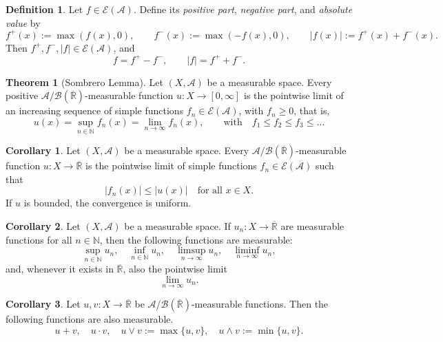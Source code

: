 \documentclass[12pt]{article}
\theoremstyle{definition}
\newtheorem{definition}{Definition}[section]
\newtheorem{theorem}{Theorem}[section]
\newtheorem{corollary}{Corollary}[theorem]
\begin{document}
\medskip
\begin{definition}
Let \( f \in \mathcal{E}(\mathcal{A}) \). Define its \emph{positive part}, \emph{negative part}, and \emph{absolute value} by
\[
f^+(x) := \max(f(x), 0), \qquad
f^-(x) := \max(-f(x), 0), \qquad
|f(x)| := f^+(x) + f^-(x).
\]
Then \( f^+, f^-, |f| \in \mathcal{E}(\mathcal{A}) \), and
\[
f = f^+ - f^-, \qquad |f| = f^+ + f^-.
\]
\end{definition}

\medskip
\begin{theorem}[Sombrero Lemma]
Let \( (X, \mathcal{A}) \) be a measurable space. Every positive \( \mathcal{A}/\mathcal{B}(\overline{\mathbb{R}})\)-measurable function \( u : X \to [0, \infty] \) is the pointwise limit of an increasing sequence of simple functions \( f_n \in \mathcal{E}(\mathcal{A}) \), with \( f_n \geq 0 \), that is,
\[
u(x) = \sup_{n \in \mathbb{N}} f_n(x) = \lim_{n \to \infty} f_n(x), \qquad \text{with} \quad f_1 \leq f_2 \leq f_3 \leq \dots
\]
\end{theorem}

\medskip
\begin{corollary}
Let \( (X, \mathcal{A}) \) be a measurable space.  
Every \( \mathcal{A}/\mathcal{B}(\overline{\mathbb{R}})\)-measurable function \( u : X \to \overline{\mathbb{R}} \) is the pointwise limit of simple functions \( f_n \in \mathcal{E}(\mathcal{A}) \) such that
\[
|f_n(x)| \leq |u(x)| \quad \text{for all } x \in X.
\]
If \( u \) is bounded, the convergence is uniform.
\end{corollary}

\medskip
\begin{corollary}
Let \( (X, \mathcal{A}) \) be a measurable space.  
If \( u_n : X \to \overline{\mathbb{R}} \) are measurable functions for all \( n \in \mathbb{N} \), then the following functions are measurable:
\[
\sup_{n \in \mathbb{N}} u_n, \quad 
\inf_{n \in \mathbb{N}} u_n, \quad 
\limsup_{n \to \infty} u_n, \quad 
\liminf_{n \to \infty} u_n,
\]
and, whenever it exists in \( \overline{\mathbb{R}} \), also the pointwise limit
\[
\lim_{n \to \infty} u_n.
\]
\end{corollary}

\medskip
\begin{corollary}
Let \( u, v : X \to \overline{\mathbb{R}} \) be \( \mathcal{A} \)/\( \mathcal{B}(\overline{\mathbb{R}}) \)-measurable functions. Then the following functions are also measurable.
\[
u + v, \quad u \cdot v, \quad u \vee v := \max\{u, v\}, \quad u \wedge v := \min\{u, v\}.
\]
\end{corollary}
\end{document}
